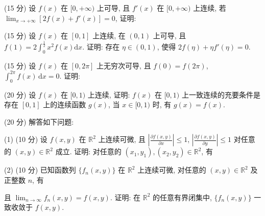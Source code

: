 \par{}
(15 分) 设 $f(x)$ 在 $[0, +\infty)$ 上可导, 且 $f'(x)$ 在 $[0, +\infty)$ 上连续, 若 $\lim_{x \to +\infty} [2f(x) + f'(x)] = 0$, 证明:\par
\nopagebreak[4]
(15 分) 设 $f(x)$ 在 $[0,1]$ 上连续, 在 $(0,1)$ 上可导, 且 $f(1) = 2\int_{0}^{\frac{1}{2}} x^{2}f(x) \mathrm{d}x$. 证明: 存在 $\eta \in (0,1)$, 使得 $2f(\eta) + \eta f'(\eta) = 0$.\par
\par{}
(15 分) 设 $f(x)$ 在 $[0, 2\pi]$ 上无穷次可导, 且 $f(0) = f(2\pi)$, $\int_{0}^{2\pi} f(x) \, \mathrm{d}x = 0$. 证明:\par
\nopagebreak[4]
(20 分) 设 $f(x)$ 在 $[0,1)$ 上连续, 证明: $f(x)$ 在 $[0,1)$ 上一致连续的充要条件是存在 $[0,1]$ 上的连续函数 $g(x)$, 当 $x \in [0,1)$ 时, 有 $g(x) = f(x)$.\par
(20 分) 解答如下问题:\par
\par{}
(1) (10 分) 设 $f(x, y)$ 在 $\mathbb{R}^2$ 上连续可微, 且 $\left|\frac{\partial f(x, y)}{\partial x}\right| \leq 1$, $\left|\frac{\partial f(x, y)}{\partial y}\right| \leq 1$ 对任意的 $(x, y) \in \mathbb{R}^2$ 成立. 证明: 对任意的 $(x_1, y_1), (x_2, y_2) \in \mathbb{R}^2$, 有\par
\nopagebreak[4]
\par{}
(2) (10 分) 已知函数列 $\{f_n(x, y)\}$ 在 $\mathbb{R}^2$ 上连续可微, 对任意的 $(x, y) \in \mathbb{R}^2$ 及正整数 $n$, 有\par
\nopagebreak[4]
且 $\lim_{n\to \infty}f_n(x,y) = f(x,y)$. 证明: 在 $\mathbb{R}^2$ 的任意有界闭集中, $\{f_n(x,y)\}$ 一致收敛于 $f(x,y)$.\par

